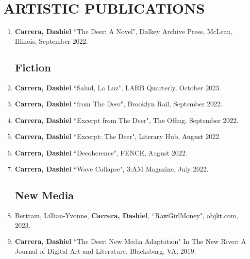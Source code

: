  \section{ARTISTIC PUBLICATIONS}
 \begin{enumerate}
 
 \subsection{Novels}
 \item \textbf{Carrera, Dashiel} ``The Deer: A Novel", Dalkey Archive Press, McLean, Illinois, September 2022. \\
 
\subsection{Fiction}
\item \textbf{Carrera, Dashiel} ``Salud, La Luz", LARB Quarterly, October 2023. \\
\item \textbf{Carrera, Dashiel} ``from The Deer", Brooklyn Rail, September 2022. \\
\item \textbf{Carrera, Dashiel} ``Excerpt from The Deer", The Offing, September 2022. \\
\item \textbf{Carrera, Dashiel} ``Excerpt: The Deer", Literary Hub, August 2022. \\
\item \textbf{Carrera, Dashiel} ``Decoherence", FENCE, August 2022. \\
\item \textbf{Carrera, Dashiel} ``Wave Collapse", 3:AM Magazine, July 2022. \\


\subsection{New Media}
\item Bertram, Lillian-Yvonne, \textbf{Carrera, Dashiel}, ``RawGirlMoney", objkt.com, 2023.
\item \textbf{Carrera, Dashiel} ``The Deer: New Media Adaptation" In The New River: A Journal of Digital Art and Literature, Blacksburg, VA, 2019.\\


\end{enumerate}
